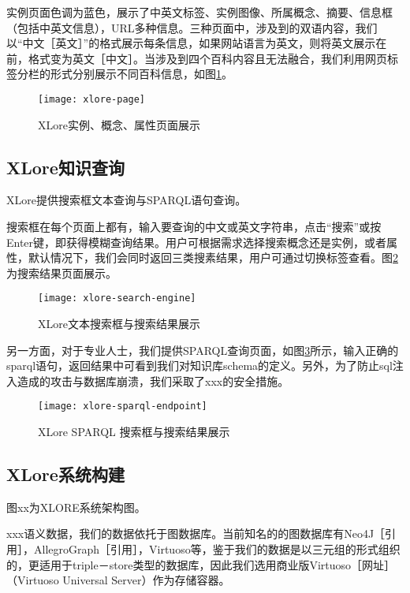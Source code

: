 实例页面色调为蓝色，展示了中英文标签、实例图像、所属概念、摘要、信息框（包括中英文信息），URL多种信息。三种页面中，涉及到的双语内容，我们以“中文［英文］”的格式展示每条信息，如果网站语言为英文，则将英文展示在前，格式变为英文［中文］。当涉及到四个百科内容且无法融合，我们利用网页标签分栏的形式分别展示不同百科信息，如图\ref{fig:xlore-page}。

\begin{figure}[H] 
  \centering
  \texttt{[image: xlore-page]}
  \caption{XLore实例、概念、属性页面展示}
  \label{fig:xlore-page}
\end{figure}

\subsection{XLore知识查询}
XLore提供搜索框文本查询与SPARQL语句查询。

搜索框在每个页面上都有，输入要查询的中文或英文字符串，点击“搜索”或按Enter键，即获得模糊查询结果。用户可根据需求选择搜索概念还是实例，或者属性，默认情况下，我们会同时返回三类搜素结果，用户可通过切换标签查看。图\ref{fig:xlore-search-engine}为搜索结果页面展示。

\begin{figure}[H] 
  \centering
  \texttt{[image: xlore-search-engine]}
  \caption{XLore文本搜索框与搜索结果展示}
  \label{fig:xlore-search-engine}
\end{figure}

另一方面，对于专业人士，我们提供SPARQL查询页面，如图\ref{fig:xlore-sparql-endpoint}所示，输入正确的sparql语句，返回结果中可看到我们对知识库schema的定义。另外，为了防止sql注入造成的攻击与数据库崩溃，我们采取了xxx的安全措施。

\begin{figure}[H] 
  \centering
  \texttt{[image: xlore-sparql-endpoint]}
  \caption{XLore SPARQL 搜索框与搜索结果展示}
  \label{fig:xlore-sparql-endpoint}
\end{figure}

\subsection{XLore系统构建}
图xx为XLORE系统架构图。

xxx语义数据，我们的数据依托于图数据库。当前知名的的图数据库有Neo4J［引用］，AllegroGraph［引用］，Virtuoso等，鉴于我们的数据是以三元组的形式组织的，更适用于triple－store类型的数据库，因此我们选用商业版Virtuoso［网址］（Virtuoso Universal Server）作为存储容器。

